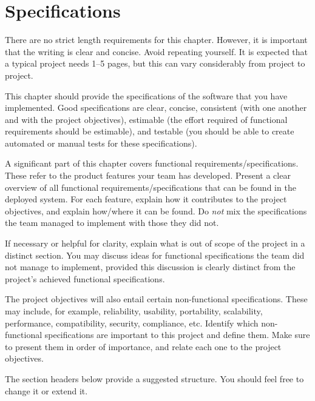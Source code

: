 \chapter{Specifications}
\label{chap:specifications}


\begin{length}
There are no strict length requirements for this chapter.  However, it is important that the writing is clear and concise.  Avoid repeating yourself.  It is expected that a typical project needs 1--5 pages, but this can vary considerably from project to project.
\end{length}

\begin{expectations}
This chapter should provide the specifications of the software that you have implemented.  Good specifications are clear, concise, consistent (with one another and with the project objectives), estimable (the effort required of functional requirements should be estimable), and testable (you should be able to create automated or manual tests for these specifications).

A significant part of this chapter covers functional requirements/specifications.  These refer to the product features your team has developed.  Present a clear overview of all functional requirements/specifications that can be found in the deployed system.  For each feature, explain how it contributes to the project objectives, and explain how/where it can be found.  Do \emph{not} mix the specifications the team managed to implement with those they did not.  

If necessary or helpful for clarity, explain what is out of scope of the project in a distinct section.  You may discuss ideas for functional specifications the team did not manage to implement, provided this discussion is clearly distinct from the project's achieved functional specifications.

The project objectives will also entail certain non-functional specifications.  These may include, for example, reliability, usability, portability, scalability, performance, compatibility, security, compliance, etc.  Identify which non-functional specifications are important to this project and define them.  Make sure to present them in order of importance, and relate each one to the project objectives.  

The section headers below provide a suggested structure.  You should feel free to change it or extend it.
\end{expectations}

